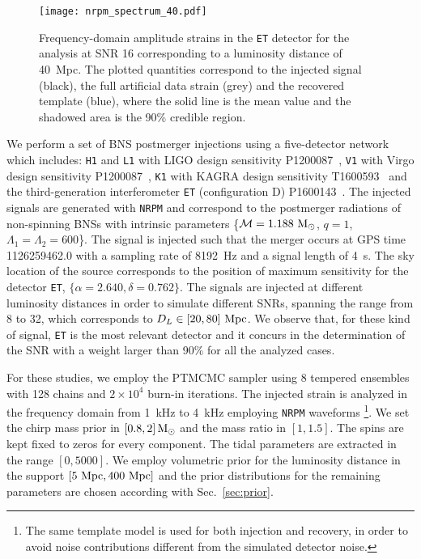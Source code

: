 \documentclass[prd,aps,twocolumn,a4paper,showkeys,nofootinbib,floatfix]{revtex4-1}
\def\M{\mathcal{M}}
\def\Mo{{\rm M_{\odot}}}
\begin{document}
\begin{figure}[t]
	\centering 

	\texttt{[image: nrpm\_spectrum\_40.pdf]}	
	\caption{Frequency-domain amplitude strains
		in the {\tt ET} detector
		for the analysis at SNR 16 corresponding to a 
		luminosity distance of 40~Mpc.				
		The plotted quantities correspond to 
		the injected signal (black), 
		the full artificial data strain (grey) and
		the recovered template (blue),
		where the solid line is the mean value 
		and the shadowed area is the 90\% credible region. 
	}
	\label{fig:injrec_pm}
\end{figure}

We perform a set of BNS postmerger injections 
using a five-detector network which includes: 
{\tt H1} and {\tt L1} with LIGO design sensitivity P1200087~\cite{TheLIGOScientific:2014jea,Aasi:2013wya,Harry:2010zz},
 {\tt V1} with Virgo design sensitivity P1200087~\cite{TheVirgo:2014hva},
 {\tt K1} with KAGRA design sensitivity T1600593~\cite{Aso:2013eba,Akutsu:2018axf}
 and the third-generation interferometer
{\tt ET} (configuration D) P1600143~\cite{Punturo:2010zz,Hild:2010id}.
The injected signals are generated with {\tt NRPM} and correspond
to the postmerger radiations of non-spinning BNSs with intrinsic parameters
\{$\M=1.188~\Mo$, $q=1$, $\Lambda_1=\Lambda_2 = 600$\}.
The signal is injected such that the merger occurs at GPS time 1126259462.0
with a sampling rate of 8192~Hz and a signal length of 4~s.
The sky location of the source corresponds to the position of 
maximum sensitivity for the detector {\tt ET}, 
$\{\alpha=2.640, \delta=0.762\}$.
The signals are injected at different luminosity distances 
in order to simulate different SNRs, spanning the range 
from 8 to 32, which corresponds to $D_L\in[20, 80]~{\rm Mpc}$.
We observe that, for these kind of signal, 
{\tt ET} is the most relevant
detector and it concurs in the determination of the SNR with a weight 
larger than 90\% for all the analyzed cases.

For these studies, we employ the PTMCMC  sampler
using 8 tempered ensembles with 128 chains and $2\times10^4$ burn-in iterations.
The injected strain is analyzed 
in the frequency domain from 1~kHz to 4~kHz
employing {\tt NRPM} waveforms
\footnote{
	The same template model is used for both injection 
	and recovery, in order to avoid noise contributions different from 
	the simulated detector noise.}. 
We set the chirp mass prior in $[0.8, 2]\,\Mo$ and the mass ratio in $[1,1.5]$.
The spins are kept fixed to zeros for every component.
The tidal parameters are extracted in the range $[0,5000]$.
We employ volumetric prior for the luminosity distance 
in the support $[5~{\rm Mpc},400~{\rm Mpc}]$
and the prior distributions for the remaining parameters are chosen 
according with Sec.~\ref{sec:prior}.
\end{document}
